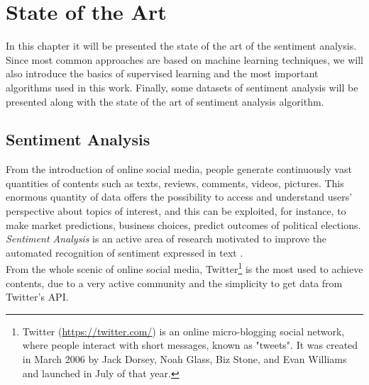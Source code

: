 
\chapter{State of the Art}


In this chapter it will be presented the state of the art of the sentiment analysis. Since most common approaches are based on machine learning techniques, we will also introduce the basics of supervised learning and the most important algorithms used in this work. Finally, some datasets of sentiment analysis will be presented along with the state of the art of sentiment analysis algorithm.


\section{Sentiment Analysis}


From the introduction of online social media, people generate continuously vast quantities of contents such as texts, reviews, comments, videos, pictures. This enormous quantity of data offers the possibility to access and understand users' perspective about topics of interest, and this can be exploited, for instance, to make market predictions, business choices, predict outcomes of political elections. \textit{Sentiment Analysis} is an active area of research motivated to improve the automated recognition of sentiment expressed in text \cite{Zimbra:2018:STS:3210372.3185045}.\\
From the whole scenic of online social media, Twitter\footnote[1]{Twitter (\url{https://twitter.com/}) is an online micro-blogging social network, where people interact with short messages, known as "tweets". It was created in March 2006 by Jack Dorsey, Noah Glass, Biz Stone, and Evan Williams and launched in July of that year.} is the most used to achieve contents, due to a very active community and the simplicity to get data from Twitter's \ac{API}. 
